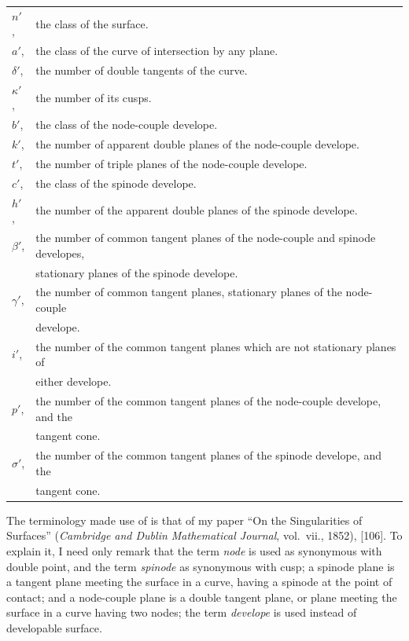 \documentclass[11pt,a4paper]{book}
\theoremstyle{plain}
\begin{document}
\begin{tabular}{@{}ll@{}}
$n'$, & the class of the surface. \\
$a'$, & the class of the curve of intersection by any plane. \\
$\delta'$, & the number of double tangents of the curve. \\
$\kappa'$, & the number of its cusps. \\
$b'$, & the class of the node-couple develope. \\
$k'$, & the number of apparent double planes of the node-couple develope. \\
$t'$, & the number of triple planes of the node-couple develope. \\
$c'$, & the class of the spinode develope. \\
$h'$, & the number of the apparent double planes of the spinode develope. \\
$\beta'$, & the number of common tangent planes of the node-couple and spinode developes, \\
 & \quad stationary planes of the spinode develope. \\
$\gamma'$, & the number of common tangent planes, stationary planes of the node-couple \\
 & \quad develope. \\
$i'$, & the number of the common tangent planes which are not stationary planes of \\
 & \quad either develope. \\
$p'$, & the number of the common tangent planes of the node-couple develope, and the \\
 & \quad tangent cone. \\
$\sigma'$, & the number of the common tangent planes of the spinode develope, and the \\
 & \quad tangent cone. \\
\end{tabular}

The terminology made use of is that of my paper ``On the Singularities of Surfaces'' (\textit{Cambridge and Dublin Mathematical Journal}, vol.~vii., 1852), [106]. To explain it, I need only remark that the term \textit{node} is used as synonymous with double point, and the term \textit{spinode} as synonymous with cusp; a spinode plane is a tangent plane meeting the surface in a curve, having a spinode at the point of contact; and a node-couple plane is a double tangent plane, or plane meeting the surface in a curve having two nodes; the term \textit{develope} is used instead of developable surface.
\end{document}
